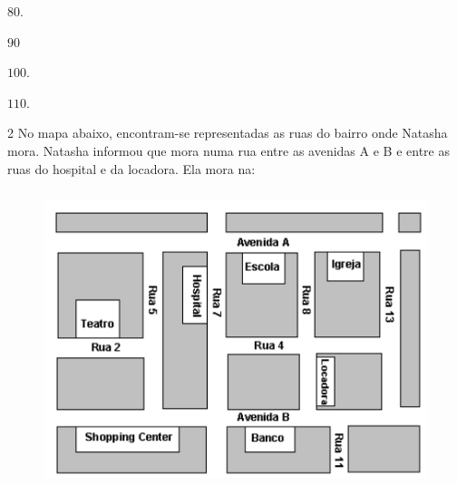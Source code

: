 \begin{escolha}
\item $80$.
\item $90$
\item $100$.
\item $110$.
\end{escolha}



\num{2}  No mapa abaixo, encontram-se representadas as ruas do bairro onde
Natasha mora. Natasha informou que mora numa rua entre as avenidas A e B e entre as
ruas do hospital e da locadora. Ela mora na:

\begin{figure}[h]
\centering\includegraphics[width=4.76042in,height=3.42708in]{./imgSAEB_6_MAT/media/image75.png}
\end{figure}

